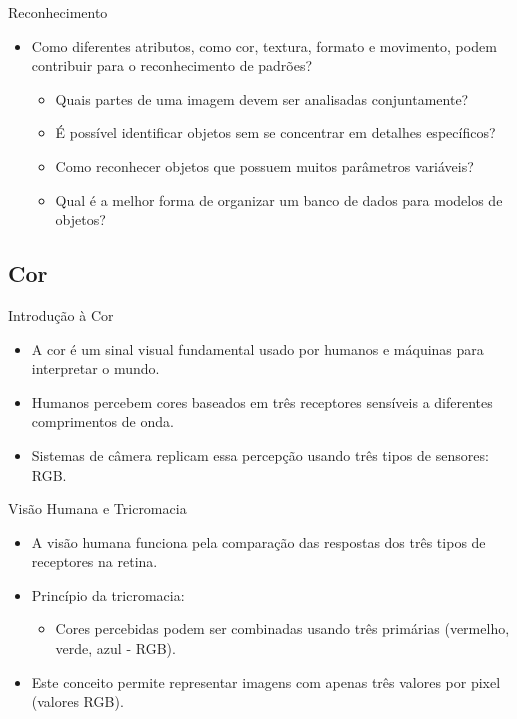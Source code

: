 \documentclass{beamer}
\begin{document}
\begin{frame}{Reconhecimento}
    \begin{itemize}
        \item Como diferentes atributos, como cor, textura, formato e movimento, podem contribuir para o reconhecimento de padrões?
        \begin{itemize}
            \item Quais partes de uma imagem devem ser analisadas conjuntamente?
            \item É possível identificar objetos sem se concentrar em detalhes específicos?
            \item Como reconhecer objetos que possuem muitos parâmetros variáveis?
            \item Qual é a melhor forma de organizar um banco de dados para modelos de objetos?
        \end{itemize}
    \end{itemize}
\end{frame}

\subsection{Cor}
\begin{frame}{Introdução à Cor}
    \begin{itemize}
        \item A cor é um sinal visual fundamental usado por humanos e máquinas para interpretar o mundo.
        \item Humanos percebem cores baseados em três receptores sensíveis a diferentes comprimentos de onda.
        \item Sistemas de câmera replicam essa percepção usando três tipos de sensores: RGB.
    \end{itemize}
\end{frame}

\begin{frame}{Visão Humana e Tricromacia}
    \begin{itemize}
        \item A visão humana funciona pela comparação das respostas dos três tipos de receptores na retina.
        \item Princípio da tricromacia:
        \begin{itemize}
            \item Cores percebidas podem ser combinadas usando três primárias (vermelho, verde, azul - RGB).
        \end{itemize}
        \item Este conceito permite representar imagens com apenas três valores por pixel (valores RGB).
    \end{itemize}
\end{frame}
\end{document}
